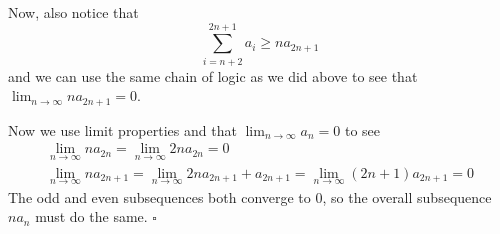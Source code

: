 \documentclass[12pt]{article}
\begin{document}
Now, also notice that
\[\sum_{i=n+2}^{2n+1} a_i \ge na_{2n+1}\]
and we can use the same chain of logic as we did above to see that $\lim_{n \to \infty} na_{2n+1}=0$.

Now we use limit properties and that $\lim_{n \to \infty} a_n=0$ to see
\begin{gather*}
  \lim_{n \to \infty} na_{2n} = \lim_{n \to \infty} 2na_{2n}=0 \\
  \lim_{n \to \infty} na_{2n+1}= \lim_{n \to \infty} 2na_{2n+1}+a_{2n+1}= \lim_{n \to \infty} (2n+1)a_{2n+1}=0
\end{gather*}
The odd and even subsequences both converge to $0$,
so the overall subsequence $na_n$ must do the same. $\square$
\end{document}
